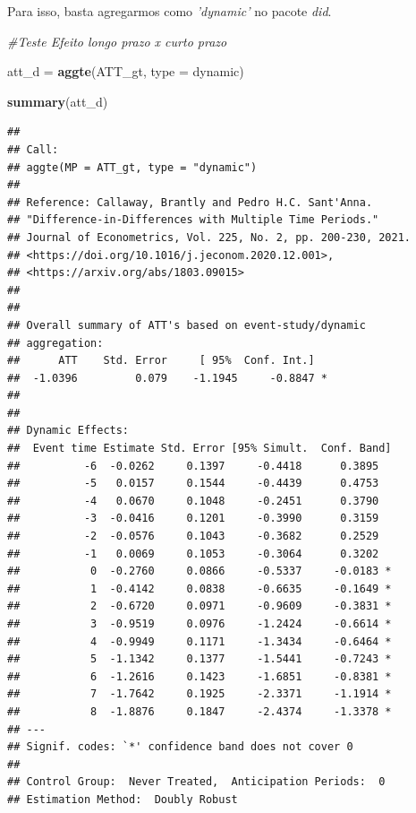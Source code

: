 \documentclass[portugues]{article}
\newenvironment{Shaded}{\begin{snugshade}}{\end{snugshade}}
\newcommand{\AttributeTok}[1]{\textcolor[rgb]{0.13,0.29,0.53}{#1}}
\newcommand{\CommentTok}[1]{\textcolor[rgb]{0.56,0.35,0.01}{\textit{#1}}}
\newcommand{\FunctionTok}[1]{\textcolor[rgb]{0.13,0.29,0.53}{\textbf{#1}}}
\newcommand{\NormalTok}[1]{#1}
\newcommand{\OtherTok}[1]{\textcolor[rgb]{0.56,0.35,0.01}{#1}}
\newcommand{\StringTok}[1]{\textcolor[rgb]{0.31,0.60,0.02}{#1}}
\begin{document}
Para isso, basta agregarmos como \textit{'dynamic'} no pacote \textit{did}. 

\begin{box_code}

\begin{Shaded}
\begin{Highlighting}[]
\CommentTok{\#Teste Efeito longo prazo x curto prazo}

\NormalTok{att\_d }\OtherTok{=} \FunctionTok{aggte}\NormalTok{(ATT\_gt, }\AttributeTok{type =} \StringTok{\textquotesingle{}dynamic\textquotesingle{}}\NormalTok{)}

\FunctionTok{summary}\NormalTok{(att\_d)}
\end{Highlighting}
\end{Shaded}

\begin{verbatim}
## 
## Call:
## aggte(MP = ATT_gt, type = "dynamic")
## 
## Reference: Callaway, Brantly and Pedro H.C. Sant'Anna.  
## "Difference-in-Differences with Multiple Time Periods." 
## Journal of Econometrics, Vol. 225, No. 2, pp. 200-230, 2021. 
## <https://doi.org/10.1016/j.jeconom.2020.12.001>, 
## <https://arxiv.org/abs/1803.09015> 
## 
## 
## Overall summary of ATT's based on event-study/dynamic 
## aggregation:  
##      ATT    Std. Error     [ 95%  Conf. Int.]  
##  -1.0396         0.079    -1.1945     -0.8847 *
## 
## 
## Dynamic Effects:
##  Event time Estimate Std. Error [95% Simult.  Conf. Band]  
##          -6  -0.0262     0.1397     -0.4418      0.3895  
##          -5   0.0157     0.1544     -0.4439      0.4753  
##          -4   0.0670     0.1048     -0.2451      0.3790  
##          -3  -0.0416     0.1201     -0.3990      0.3159  
##          -2  -0.0576     0.1043     -0.3682      0.2529  
##          -1   0.0069     0.1053     -0.3064      0.3202  
##           0  -0.2760     0.0866     -0.5337     -0.0183 *
##           1  -0.4142     0.0838     -0.6635     -0.1649 *
##           2  -0.6720     0.0971     -0.9609     -0.3831 *
##           3  -0.9519     0.0976     -1.2424     -0.6614 *
##           4  -0.9949     0.1171     -1.3434     -0.6464 *
##           5  -1.1342     0.1377     -1.5441     -0.7243 *
##           6  -1.2616     0.1423     -1.6851     -0.8381 *
##           7  -1.7642     0.1925     -2.3371     -1.1914 *
##           8  -1.8876     0.1847     -2.4374     -1.3378 *
## ---
## Signif. codes: `*' confidence band does not cover 0
## 
## Control Group:  Never Treated,  Anticipation Periods:  0
## Estimation Method:  Doubly Robust
\end{verbatim}

\end{box_code}
\end{document}
